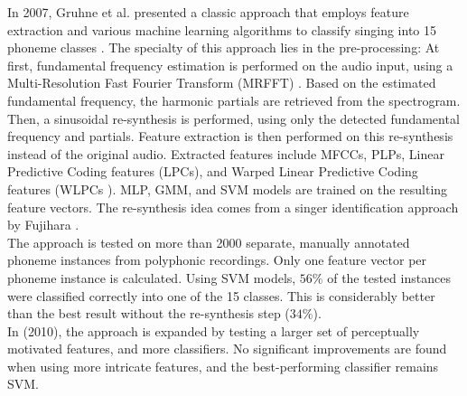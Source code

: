 In 2007, Gruhne et al. presented a classic approach that employs feature extraction and various machine learning algorithms to classify singing into 15 phoneme classes \cite{Gruhne2007} \cite{Gruhne2007a}. The specialty of this approach lies in the pre-processing: At first, fundamental frequency estimation is performed on the audio input, using a Multi-Resolution Fast Fourier Transform (MRFFT) \cite{inproceedings:dressler}. Based on the estimated fundamental frequency, the harmonic partials are retrieved from the spectrogram. Then, a sinusoidal re-synthesis is performed, using only the detected fundamental frequency and partials. Feature extraction is then performed on this re-synthesis instead of the original audio. Extracted features include MFCCs, PLPs, Linear Predictive Coding features (LPCs), and Warped Linear Predictive Coding features (WLPCs \cite{lpc}). MLP, GMM, and SVM models are trained on the resulting feature vectors. The re-synthesis idea comes from a singer identification approach by Fujihara \cite{fujihara_identification}.\\
The approach is tested on more than 2000 separate, manually annotated phoneme instances from polyphonic recordings. Only one feature vector per phoneme instance is calculated. Using SVM models, $56\%$ of the tested instances were classified correctly into one of the 15 classes. This is considerably better than the best result without the re-synthesis step ($34\%$).\\
In \cite{szepannek} (2010), the approach is expanded by testing a larger set of perceptually motivated features, and more classifiers. No significant improvements are found when using more intricate features, and the best-performing classifier remains SVM.\\

